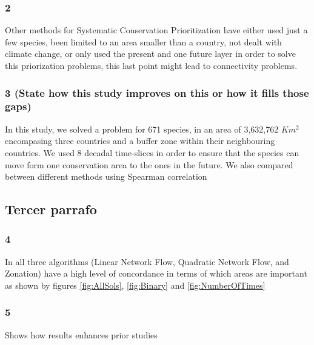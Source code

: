 \documentclass[]{article}
\begin{document}
\hypertarget{section}{%
\subsubsection{2}\label{section}}

Other methods for Systematic Conservation Prioritization have either used just a few species, been limited to an area smaller than a country, not dealt with climate change, or only used the present and one future layer in order to solve this priorization problems, this last point might lead to connectivity problems.

\hypertarget{state-how-this-study-improves-on-this-or-how-it-fills-those-gaps}{%
\subsubsection{3 (State how this study improves on this or how it fills those gaps)}\label{state-how-this-study-improves-on-this-or-how-it-fills-those-gaps}}

In this study, we solved a problem for 671 species, in an area of 3,632,762 \(Km^2\) encompasing three countries and a buffer zone within their neighbouring countries. We used 8 decadal time-slices in order to ensure that the species can move form one conservation area to the ones in the future. We also compared between different methods using Spearman correlation

\hypertarget{tercer-parrafo}{%
\subsection{Tercer parrafo}\label{tercer-parrafo}}

\hypertarget{section-1}{%
\subsubsection{4}\label{section-1}}

In all three algorithms (Linear Network Flow, Quadratic Network Flow, and Zonation) have a high level of concordance in terms of which areas are important as shown by figures \ref{fig:AllSols}, \ref{fig:Binary} and \ref{fig:NumberOfTimes}

\hypertarget{section-2}{%
\subsubsection{5}\label{section-2}}

Shows how results enhances prior studies
\end{document}
